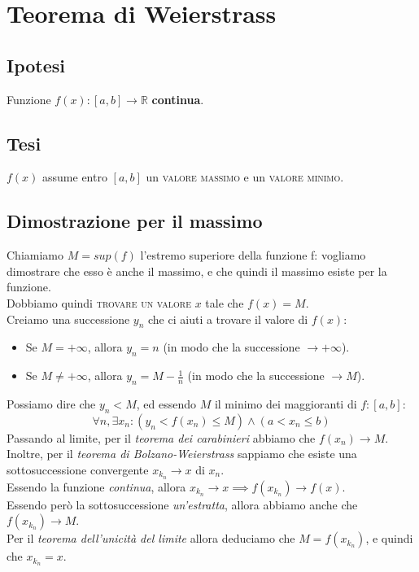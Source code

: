 \documentclass{article}
\begin{document}
\newpage

\section{Teorema di Weierstrass}

\begin{multicols}{2}
    \subsection{Ipotesi}
    Funzione \(f(x) : [a, b] \to \mathbb{R}\) \textbf{continua}.
\columnbreak
    \subsection{Tesi}
    \(f(x)\) assume entro \([a, b]\) un \textsc{valore massimo} e un \textsc{valore minimo}.
\end{multicols}

\subsection{Dimostrazione per il massimo}
Chiamiamo \(M = sup(f)\) l'estremo superiore della funzione f: vogliamo dimostrare che esso è anche il massimo, e che quindi il massimo esiste per la funzione.\\
Dobbiamo quindi \textsc{trovare un valore} \(x\) tale che \(f(x) = M\).\\
Creiamo una successione \(y_n\) che ci aiuti a trovare il valore di \(f(x)\):
\begin{itemize}
    \item Se \(M = +\infty\), allora \(y_n = n\) (in modo che la successione \(\to +\infty\)).
    \item Se \(M \neq +\infty\), allora \(y_n = M - \frac{1}{n}\) (in modo che la successione \(\to M\)).
\end{itemize}
Possiamo dire che \(y_n < M\), ed essendo \(M\) il minimo dei maggioranti di \(f : [a, b]\):
\[\forall n, \exists x_n : (y_n < f(x_n) \leq M) \land (a < x_n \leq b) \]
Passando al limite, per il \textit{teorema dei carabinieri} abbiamo che \(f(x_n) \to M\).\\
Inoltre, per il \textit{teorema di Bolzano-Weierstrass} sappiamo che esiste una sottosuccessione convergente \(x_{k_n} \to x\) di \(x_n\).\\
Essendo la funzione \textit{continua}, allora \(x_{k_n} \to x \implies f(x_{k_n}) \to f(x)\).\\
Essendo però la sottosuccessione \textit{un'estratta}, allora abbiamo anche che \(f(x_{k_n}) \to M\).\\
Per il \textit{teorema dell'unicità del limite} allora deduciamo che \(M = f(x_{k_n})\), e quindi che \(x_{k_n} = x\).
\end{document}
